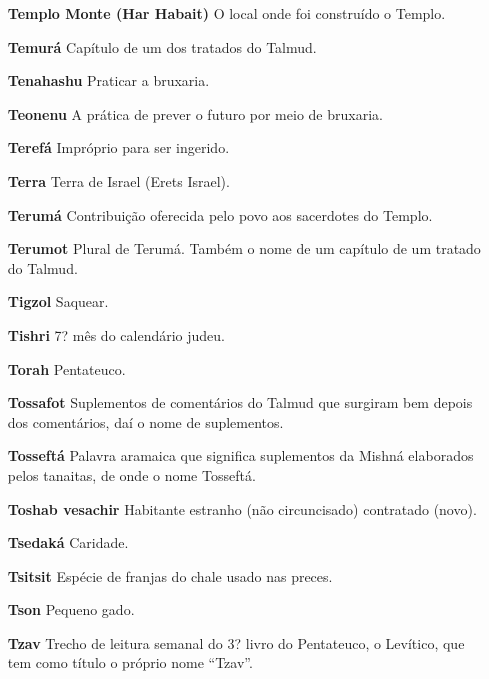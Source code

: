 \begin{itemize}
\item[\textbf{Templo Monte (Har Habait)}] O lo­cal onde foi construído o
Templo.

\item[\textbf{Temurá}] Capítulo de um dos tratados do Talmud.

\item[\textbf{Tenahashu}] Praticar a bruxaria.

\item[\textbf{Teonenu}] A prática de prever o fu­turo por meio de bruxaria.

\item[\textbf{Terefá}] Impróprio para ser ingerido.

\item[\textbf{Terra}] Terra de Israel (Erets Israel).

\item[\textbf{Terumá}] Contribuição oferecida pe­lo povo aos sacerdotes do
Templo.

\item[\textbf{Terumot}] Plural de Terumá. Também o nome de um capítulo de um tratado do Talmud.

\item[\textbf{Tigzol}] Saquear.

\item[\textbf{Tishri}] 7? mês do calendário judeu.

\item[\textbf{Torah}] Pentateuco.

\item[\textbf{Tossafot}] Suplementos de comentá­rios do Talmud que surgiram
bem de­pois dos comentários, daí o nome de suplementos.

\item[\textbf{Tosseftá}] Palavra aramaica que signifi­ca suplementos da Mishná
elaborados pelos tanaitas, de onde o nome Tosseftá.

\item[\textbf{Toshab vesachir}] Habitante estranho (não circuncisado) contratado (novo).

\item[\textbf{Tsedaká}] Caridade.

\item[\textbf{Tsitsit}] Espécie de franjas do chale usado nas preces.

\item[\textbf{Tson}] Pequeno gado.

\item[\textbf{Tzav}] Trecho de leitura semanal do 3? livro do Pentateuco, o
Levítico, que tem como título o próprio nome ``Tzav''.


\end{itemize}
